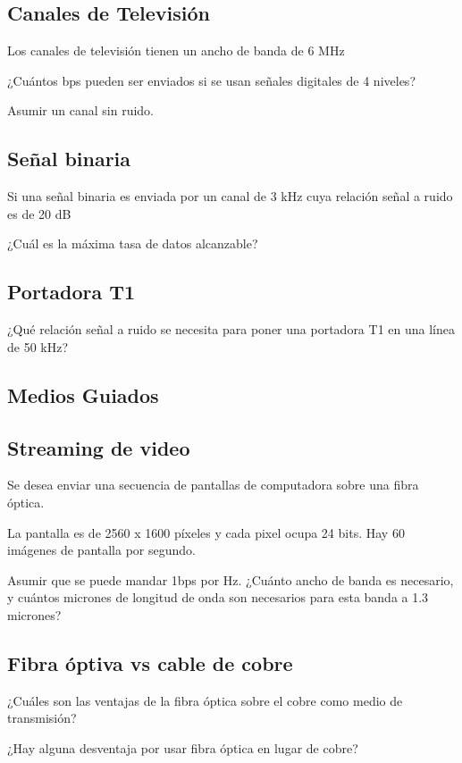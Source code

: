 \documentclass[12pt]{report}
\begin{document}
\begin{exer}
	\subsection{Canales de Televisión \sthree}
	Los canales de televisión tienen un ancho de banda de 6 MHz

	¿Cuántos bps pueden ser enviados si se usan señales digitales de 4 niveles?

	Asumir un canal sin ruido.
\end{exer}

\begin{exer}
	\subsection{Señal binaria \stwo}
	Si una señal binaria es enviada por un canal de 3 kHz cuya relación señal a ruido es de 20 dB

	¿Cuál es la máxima tasa de datos alcanzable?
\end{exer}

\begin{exer}
	\subsection{Portadora T1 \sthree}
	¿Qué relación señal a ruido se necesita para poner una portadora T1 en una línea de 50 kHz?
\end{exer}

\begin{exer}
	\section{Medios Guiados}
	\subsection{Streaming de video \stwo}
	Se desea enviar una secuencia de pantallas de computadora sobre una fibra óptica.

	La pantalla es de 2560 x 1600 píxeles y cada pixel ocupa 24 bits. Hay 60 imágenes de pantalla por segundo.

	Asumir que se puede mandar 1bps por Hz. ¿Cuánto ancho de banda es necesario, y cuántos micrones de longitud de onda son necesarios para esta banda a 1.3 micrones?
\end{exer}

\begin{exer}
	\subsection{Fibra óptiva vs cable de cobre \stwo \steo}
	¿Cuáles son las ventajas de la fibra óptica sobre el cobre como medio de transmisión?

	¿Hay alguna desventaja por usar fibra óptica en lugar de cobre?
\end{exer}
\end{document}
